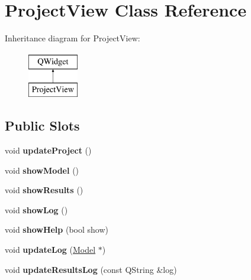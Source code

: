 \hypertarget{class_project_view}{\section{Project\-View Class Reference}
\label{class_project_view}
}
Inheritance diagram for Project\-View\-:\begin{figure}[H]
\begin{center}
\leavevmode
\includegraphics[height=2.000000cm]{class_project_view}
\end{center}
\end{figure}
\subsection*{Public Slots}
\begin{DoxyCompactItemize}
\item 
\hypertarget{class_project_view_adea84daa90fd2e0cd5611810b2ad918a}{void {\bfseries update\-Project} ()}\label{class_project_view_adea84daa90fd2e0cd5611810b2ad918a}

\item 
\hypertarget{class_project_view_aee0ef2fc263b4798dbd99128a5a2b7f9}{void {\bfseries show\-Model} ()}\label{class_project_view_aee0ef2fc263b4798dbd99128a5a2b7f9}

\item 
\hypertarget{class_project_view_ad839cac2c183e2be85845d8282e57914}{void {\bfseries show\-Results} ()}\label{class_project_view_ad839cac2c183e2be85845d8282e57914}

\item 
\hypertarget{class_project_view_a1c4867567e57211ea496e3fe45f70528}{void {\bfseries show\-Log} ()}\label{class_project_view_a1c4867567e57211ea496e3fe45f70528}

\item 
\hypertarget{class_project_view_a4dff0e59d139023a51c8e2c30cbdfe76}{void {\bfseries show\-Help} (bool show)}\label{class_project_view_a4dff0e59d139023a51c8e2c30cbdfe76}

\item 
\hypertarget{class_project_view_a0f987f26b0e152ae26885e749dcd7d00}{void {\bfseries update\-Log} (\hyperlink{class_model}{Model} $\ast$)}\label{class_project_view_a0f987f26b0e152ae26885e749dcd7d00}

\item 
\hypertarget{class_project_view_a3795f8b8f2f8ac825a3f87a5322dc306}{void {\bfseries update\-Results\-Log} (const Q\-String \&log)}\label{class_project_view_a3795f8b8f2f8ac825a3f87a5322dc306}

\end{DoxyCompactItemize}
